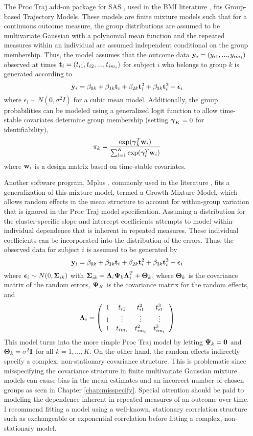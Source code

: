 The Proc Traj add-on package for SAS \cite{jones2001}, used in the BMI literature \cite{pryor2011,carter2012}, fits Group-based Trajectory Models. These models are finite mixture models such that for a continuous outcome measure, the group distributions are assumed to be multivariate Gaussian with a polynomial mean function and the repeated measures within an individual are assumed independent conditional on the group membership. Thus, the model assumes that the outcome data $\mathbf y_{i} = (y_{i1},...,y_{im_{i}})$ observed at times $\mathbf t_{i} = (t_{i1},t_{i2},...,t_{im_{i}})$ for subject $i$ who belongs to group $k$ is generated according to
$$\mathbf y_{i} = \beta_{0k}+\beta_{1k} \mathbf t_{i} + \beta_{2k}\mathbf t_{i}^{2}+ \beta_{3k} \mathbf t_{i}^{3} + \boldsymbol\epsilon_{i}$$
where $\epsilon_{i}\sim N(0,\sigma^{2}I)$ for a cubic mean model. Additionally, the group probabilities can be modeled using a generalized logit function to allow time-stable covariates determine group membership (setting $\boldsymbol\gamma_{K}=0$ for identifiability),
$$\pi_{k}=\frac{\exp(\boldsymbol\gamma_{k}^{T}\mathbf w_{i})}{\sum^{K}_{l=1}\exp(\boldsymbol\gamma_{l}^{T}\mathbf w_{i})}$$
where $\mathbf w_{i}$ is a design matrix based on time-stable covariates. 

Another software program, Mplus \cite{muthen2010}, commonly used in the literature \cite{li2007,garden2012}, fits a generalization of this mixture model, termed a Growth Mixture Model, which allows random effects in the mean structure to account for within-group variation that is ignored in the Proc Traj model specification. Assuming a distribution for the cluster-specific slope and intercept coefficients attempts to model within-individual dependence that is inherent in repeated measures. These individual coefficients can be incorporated into the distribution of the errors. Thus, the observed data for subject $i$ is assumed to be generated by
$$\mathbf y_{i} = \beta_{0k}+\beta_{1k} \mathbf t_{i} + \beta_{2k}\mathbf t_{i}^{2}+ \beta_{3k} \mathbf t_{i}^{3} +\boldsymbol \epsilon_{i}$$
where $\boldsymbol\epsilon_{i}\sim N(0,\boldsymbol\Sigma_{ik})$ with $\boldsymbol\Sigma_{ik}=\boldsymbol\Lambda_{i}\boldsymbol\Psi_{k}\boldsymbol\Lambda_{i}^{T}+\boldsymbol\Theta_{k}$, where $\boldsymbol\Theta_{k}$ is the covariance matrix of the random errors, $\boldsymbol\Psi_{K}$ is the covariance matrix for the random effects, and $$\boldsymbol\Lambda_{i}=\left(\begin{array}{cccc}1&t_{i1}&t_{i1}^{2}&t_{i1}^{3}\\ 1&\vdots&\vdots&\vdots\\ 1&t_{im_{i}}&t_{im_{i}}^{2}&t_{im_{i}}^{3} \end{array} \right)$$
This model turns into the more simple Proc Traj model by letting $\boldsymbol\Psi_{k}=\mathbf 0$ and $\boldsymbol\Theta_{k}=\sigma^{2}\mathbf I$ for all $k=1,...,K$. On the other hand, the random effects indirectly specify a complex, non-stationary covariance structure. This is problematic since misspecifying the covariance structure in finite multivariate Gaussian mixture models can cause bias in the mean estimates and an incorrect number of chosen groups as seen in Chapter \ref{chap:misspecify}. Special attention should be paid to modeling the dependence inherent in repeated measures of an outcome over time. I recommend fitting a model using a well-known, stationary correlation structure such as exchangeable or exponential correlation before fitting a complex, non-stationary model. 

